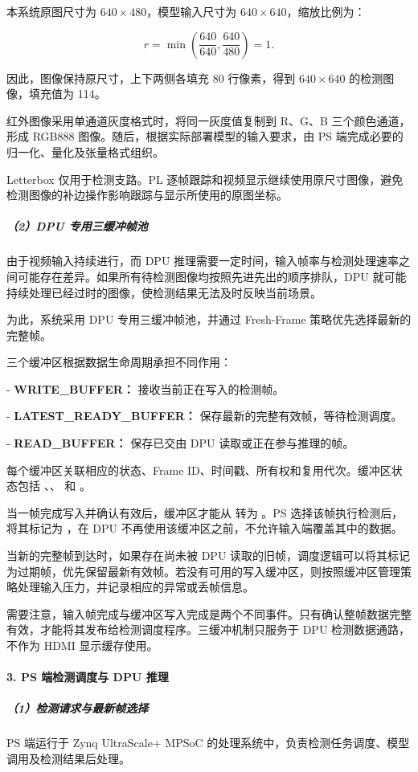 \documentclass[UTF8,a4paper,12pt,fontset=windows]{ctexart}
\begin{document}
本系统原图尺寸为 \(640\times480\)，模型输入尺寸为 \(640\times640\)，缩放比例为：

\[
r=\min\left(\frac{640}{640},\frac{640}{480}\right)=1.
\]

因此，图像保持原尺寸，上下两侧各填充 80 行像素，得到 \(640\times640\) 的检测图像，填充值为 114。

红外图像采用单通道灰度格式时，将同一灰度值复制到 R、G、B 三个颜色通道，形成 RGB888 图像。随后，根据实际部署模型的输入要求，由 PS 端完成必要的归一化、量化及张量格式组织。

Letterbox 仅用于检测支路。PL 逐帧跟踪和视频显示继续使用原尺寸图像，避免检测图像的补边操作影响跟踪与显示所使用的原图坐标。

\subparagraph*{（2）DPU 专用三缓冲帧池}
由于视频输入持续进行，而 DPU 推理需要一定时间，输入帧率与检测处理速率之间可能存在差异。如果所有待检测图像均按照先进先出的顺序排队，DPU 就可能持续处理已经过时的图像，使检测结果无法及时反映当前场景。

为此，系统采用 DPU 专用三缓冲帧池，并通过 Fresh-Frame 策略优先选择最新的完整帧。

三个缓冲区根据数据生命周期承担不同作用：

- \textbf{WRITE\_BUFFER：} 接收当前正在写入的检测帧。

- \textbf{LATEST\_READY\_BUFFER：} 保存最新的完整有效帧，等待检测调度。

- \textbf{READ\_BUFFER：} 保存已交由 DPU 读取或正在参与推理的帧。

每个缓冲区关联相应的状态、Frame ID、时间戳、所有权和复用代次。缓冲区状态包括 、、 和 。

当一帧完成写入并确认有效后，缓冲区才能从  转为 。PS 选择该帧执行检测后，将其标记为 ，在 DPU 不再使用该缓冲区之前，不允许输入端覆盖其中的数据。

当新的完整帧到达时，如果存在尚未被 DPU 读取的旧帧，调度逻辑可以将其标记为过期帧，优先保留最新有效帧。若没有可用的写入缓冲区，则按照缓冲区管理策略处理输入压力，并记录相应的异常或丢帧信息。

需要注意，输入帧完成与缓冲区写入完成是两个不同事件。只有确认整帧数据完整有效，才能将其发布给检测调度程序。三缓冲机制只服务于 DPU 检测数据通路，不作为 HDMI 显示缓存使用。

\paragraph*{3. PS 端检测调度与 DPU 推理}
\subparagraph*{（1）检测请求与最新帧选择}
PS 端运行于 Zynq UltraScale+ MPSoC 的处理系统中，负责检测任务调度、模型调用及检测结果后处理。
\end{document}
